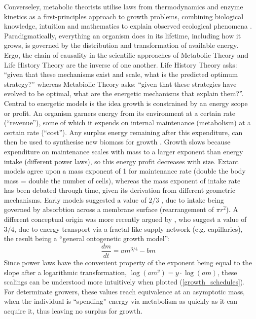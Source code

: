 \documentclass[a4paper]{article} %
\begin{document}
    Converseley, metabolic theorists utilise laws from thermodynamics and enzyme kinetics as a first-principles approach to growth problems, combining biological knowledge, intuition and mathematics to explain observed ecological phenomena \autocite{Brown2004}. Paradigmatically, everything an organism does in its lifetime, including how it grows, is governed by the distribution and transformation of available energy. Ergo, the chain of causality in the scientific approaches of Metabolic Theory and Life History Theory are the inverse of one another. Life History Theory asks: ``given that these mechanisms exist and scale, what is the predicted optimum strategy?'' whereas Metabiolic Theory asks: ``given that these strategies have evolved to be optimal, what are the energetic mechanisms that explain them?''. Central to energetic models is the idea growth is constrained by an energy scope or profit. An organism garners energy from its environment at a certain rate (``revenue''), some of which it expends on internal maintenance (metabolism) at a certain rate (``cost''). Any surplus energy remaining after this expenditure, can then be used to synthesise new biomass for growth \autocite{Holdway1984, Rochet2001}. Growth slows because expenditure on maintenance scales with mass to a larger exponent than energy intake (different power laws), so this energy profit decreases with size. Extant models agree upon a mass exponent of 1 for maintenance rate (double the body mass = double the number of cells), whereas the mass exponent of intake rate has been debated through time, given its derivation from different geometric mechanisms. Early models suggested a value of $2/3$ \autocite{Putter1920,vonBert1938, VonBertalanffy1957}, due to intake being governed by absorbtion across a membrane surface (rearrangement of $\pi r^2$). A different conceptual origin was more recently argued by \autocite{West2001}, who suggest a value of $3/4$, due to energy transport via a fractal-like supply network (e.g. capillaries), the result being a ``general ontogenetic growth model'':
    \begin{equation}
        \frac{dm}{dt} = am^{3/4} - bm \label{west_ogm}
    \end{equation}
    Since power laws have the convenient property of the exponent being equal to the slope after a logarithmic transformation, $\log{(am^y)} = y\cdot \log{(am)}$, these scalings can be understood more intuitively when plotted (\cref{growth_schedules}). For determinate growers, these values reach equivalence at an asymptotic mass, when the individual is ``spending'' energy via metabolism as quickly as it can acquire it, thus leaving no surplus for growth.
\end{document}
